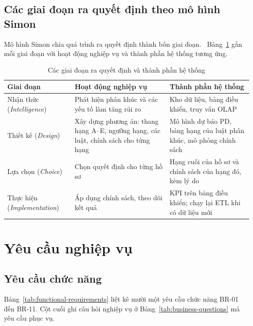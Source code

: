 \subsection{Các giai đoạn ra quyết định theo mô hình Simon}
\label{sec:simon}
Mô hình Simon chia quá trình ra quyết định thành bốn giai đoạn.~\cite{turban2005} Bảng~\ref{tab:simon-phases} gắn mỗi giai đoạn với hoạt động nghiệp vụ và thành phần hệ thống tương ứng.

\begin{table}[H]
	\centering
	\caption{Các giai đoạn ra quyết định và thành phần hệ thống}
	\label{tab:simon-phases}
	\footnotesize
	\begin{tabular}{m{3cm} p{6.2cm} p{6cm}}
		\toprule
		\textbf{Giai đoạn}                  & \textbf{Hoạt động nghiệp vụ}                                                         & \textbf{Thành phần hệ thống}                                         \\
		\midrule
		Nhận thức (\textit{Intelligence})   & Phát hiện phân khúc và các yếu tố làm tăng rủi ro                                    & Kho dữ liệu, bảng điều khiển, truy vấn OLAP                          \\
		Thiết kế (\textit{Design})          & Xây dựng phương án: thang hạng A--E, ngưỡng hạng, các luật, chính sách cho từng hạng & Mô hình dự báo PD, bảng hạng của luật phân khúc, mô phỏng chính sách \\
		Lựa chọn (\textit{Choice})          & Chọn quyết định cho từng hồ sơ                                                       & Hạng cuối của hồ sơ và chính sách của hạng đó, kèm lý do             \\
		Thực hiện (\textit{Implementation}) & Áp dụng chính sách, theo dõi kết quả                                                 & KPI trên bảng điều khiển; chạy lại ETL khi có dữ liệu mới            \\
		\bottomrule
	\end{tabular}
\end{table}

\section{Yêu cầu nghiệp vụ}
\label{sec:requirements}

\subsection{Yêu cầu chức năng}
\label{sec:functional-requirements}
Bảng~\ref{tab:functional-requirements} liệt kê mười một yêu cầu chức năng BR-01 đến BR-11. Cột cuối ghi câu hỏi nghiệp vụ ở Bảng~\ref{tab:business-questions} mà yêu cầu phục vụ.

